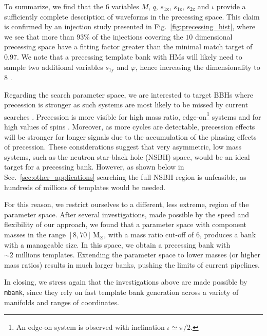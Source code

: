 \documentclass[twocolumn,showpacs,preprintnumbers,nofootinbib,prd,
superscriptaddress,10pt]{revtex4-2}
\begin{document}
To summarize, we find that the $6$ variables $M$, $q$, $s_\text{1x}$, $s_\text{1z}$, $s_\text{2z}$ and $\iota$ provide a sufficiently complete description of waveforms in the precessing space.
This claim is confirmed by an injection study presented in Fig.~\ref{fig:precessing_hist}, where we see that more than $93\%$ of the injections covering the $10$ dimensional precessing space have a fitting factor greater than the minimal match target of $0.97$.
We note that a precessing template bank with HMs will likely need to sample two additional variables $s_\text{1y}$ and $\varphi$, hence increasing the dimensionality to $8$ \cite{Thomas:2020uqj}.

Regarding the search parameter space, we are interested to target BBHs where precession is stronger as such systems are most likely to be missed by current searches \cite{PhysRevD.102.041302, Fairhurst:2019vut}.
Precession is more visible for high mass ratio, edge-on\footnote{An edge-on system is observed with inclination $\iota\simeq \pi/2$.} systems and for high values of spins \cite{CalderonBustillo:2016rlt}. Moreover, as more cycles are detectable, precession effects will be stronger for longer signals due to the accumulation of the phasing effects of precession. These considerations suggest that very asymmetric, low mass systems, such as the neutron star-black hole (NSBH) space, would be an ideal target for a precessing bank. However, as shown below in Sec.~\ref{sec:other_applications} searching the full NSBH region is unfeasible, as hundreds of millions of templates would be needed.

For this reason, we restrict ourselves to a different, less extreme, region of the parameter space. After several investigations, made possible by the speed and flexibility of our approach, we found that a parameter space with component masses in the range $[8, 70]\,\mathrm{M_\odot}$, with a mass ratio cut-off of $6$, produces a bank with a manageable size.
In this space, we obtain a precessing bank with $\sim 2 \text{ millions}$ templates. Extending the parameter space to lower masses (or higher mass ratios) results in much larger banks, pushing the limits of current pipelines.

In closing, we stress again that the investigations above are made possible by \texttt{mbank}, since they rely on fast template bank generation across a variety of manifolds and ranges of coordinates.
\end{document}
